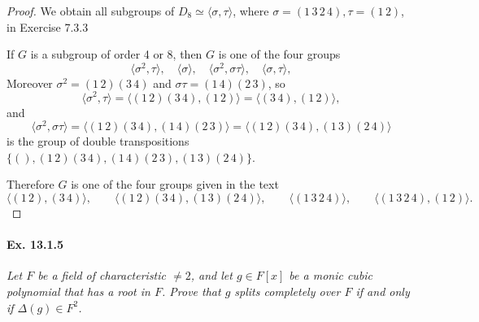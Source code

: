 \documentclass[11pt,a4paper]{article}
\begin{document}
\begin{proof}
We obtain all subgroups of $D_8  \simeq \langle \sigma,\tau \rangle$, where $\sigma =  (1\,3\,2\,4), \tau = (1\,2)$, in Exercise 7.3.3

\begin{center}
\end{center}

If $G$ is a subgroup of order 4 or 8, then $G$ is one of the four groups
$$\langle \sigma^2, \tau \rangle, \quad \langle \sigma \rangle,\quad \langle \sigma^2, \sigma  \tau  \rangle, \quad \langle \sigma,\tau\rangle,$$
Moreover $\sigma^2 = (1\,2)(3\,4)$ and $\sigma \tau = (1\,4)(2\,3)$, so 
$$\langle \sigma^2, \tau \rangle = \langle (1\,2)(3\,4), (1\,2) \rangle =  \langle (3\,4), (1\,2) \rangle,$$
and
$$\langle \sigma^2, \sigma  \tau  \rangle = \langle (1\,2)(3\,4),  (1\,4)(2\,3) \rangle =  \langle (1\,2)(3\,4),  (1\,3)(2\,4) \rangle$$
is the group of double transpositions $\{(), (1\,2)(3\,4), (1\,4)(2\,3), (1\,3)(2\,4)\}$.

Therefore $G$ is one of the four groups given in the text
$$\langle (1\,2),(3\,4) \rangle,\qquad  \langle (1\,2)(3\,4),  (1\,3)(2\,4) \rangle,\qquad  \langle (1\,3\,2\,4) \rangle, \qquad \langle (1\,3\,2\,4), (1\,2)  \rangle.$$
\end{proof}

\paragraph{Ex. 13.1.5}

{\it Let $F$ be a field of characteristic $\ne 2$, and let $g \in F[x]$ be a monic cubic polynomial that has a root in $F$. Prove that $g$ splits completely over $F$ if and only if $\Delta(g) \in F^2$.
}
\end{document}
